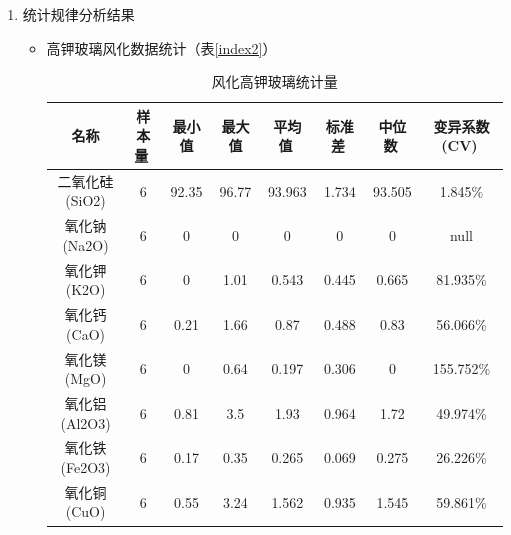 \documentclass{my_paper}
\begin{document}
\begin{enumerate}
  
    \item 统计规律分析结果
    \begin{itemize}
        \item 高钾玻璃风化数据统计（表\ref{index2}）
        
        \begin{table}[ht]
            \centering
            \caption{风化高钾玻璃统计量}
            \begin{tabular}{cccccccc}
            \toprule
            名称                   & 样本量                 & 最小值                  & 最大值                  & 平均值                 & 标准差                 & 中位数                 & 变异系数(CV)            \\
            \midrule
            二氧化硅(SiO2)           & 6                    & 92.35                & 96.77                & 93.963               & 1.734                & 93.505               & 1.845\%              \\
            氧化钠(Na2O)            & 6                    & 0                    & 0                    & 0                    & 0                    & 0                    & null                 \\
            氧化钾(K2O)             & 6                    & 0                    & 1.01                 & 0.543                & 0.445                & 0.665                & 81.935\%             \\
            氧化钙(CaO)             & 6                    & 0.21                 & 1.66                 & 0.87                 & 0.488                & 0.83                 & 56.066\%             \\
            氧化镁(MgO)             & 6                    & 0                    & 0.64                 & 0.197                & 0.306                & 0                    & 155.752\%            \\
            氧化铝(Al2O3)           & 6                    & 0.81                 & 3.5                  & 1.93                 & 0.964                & 1.72                 & 49.974\%             \\
            氧化铁(Fe2O3)           & 6                    & 0.17                 & 0.35                 & 0.265                & 0.069                & 0.275                & 26.226\%             \\
            氧化铜(CuO)             & 6                    & 0.55                 & 3.24                 & 1.562                & 0.935                & 1.545                & 59.861\%             \\

\end{tabular}
\end{table}
\end{itemize}
\end{enumerate}
\end{document}
